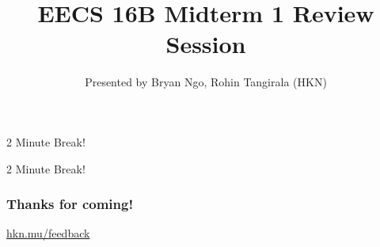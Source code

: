 

\title{EECS 16B Midterm 1 Review Session}
\author{Presented by Bryan Ngo, Rohin Tangirala (HKN)}
\date{}

\newcommand{\SlideAccessingLogistics}{@1046}










\begin{frame}
    2 Minute Break!
\end{frame}




\begin{frame}
	2 Minute Break!
\end{frame}







\begin{frame}
    \frametitle{Thanks for coming!}
    \href{https://hkn.mu/feedback}{hkn.mu/feedback}
\end{frame}


